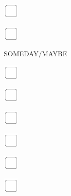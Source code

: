 \documentclass[11pt,titlepage]{article}
\begin{document}
\vspace{10mm}

\noindent
\includegraphics[]{checkbox-4mm.pdf}

\vspace{10mm}

\noindent
\includegraphics[]{checkbox-4mm.pdf}

\pagebreak

\small
\hfill SOMEDAY/MAYBE

\vspace{6mm}

\noindent
\includegraphics[]{checkbox-4mm.pdf}

\vspace{10mm}

\noindent
\includegraphics[]{checkbox-4mm.pdf}

\vspace{10mm}

\noindent
\includegraphics[]{checkbox-4mm.pdf}

\vspace{10mm}

\noindent
\includegraphics[]{checkbox-4mm.pdf}

\vspace{10mm}

\noindent
\includegraphics[]{checkbox-4mm.pdf}

\vspace{10mm}

\noindent
\includegraphics[]{checkbox-4mm.pdf}
\end{document}

